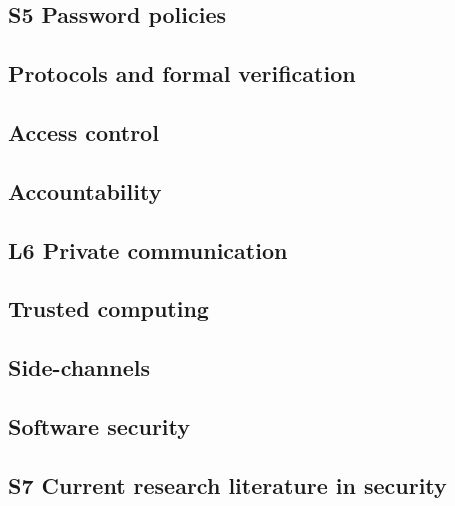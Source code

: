 \subsection{S5 Password policies}


\subsection{Protocols and formal verification}


\subsection{Access control}


%

\subsection{Accountability}


\subsection{L6 Private communication}


\subsection{Trusted computing}


\subsection{Side-channels}


\subsection{Software security}


\subsection{S7 Current research literature in security}


